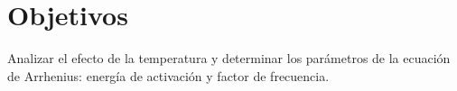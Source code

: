 \section{Objetivos}

Analizar el efecto de la temperatura y determinar los parámetros de la ecuación de
Arrhenius: energía de activación y factor de frecuencia.